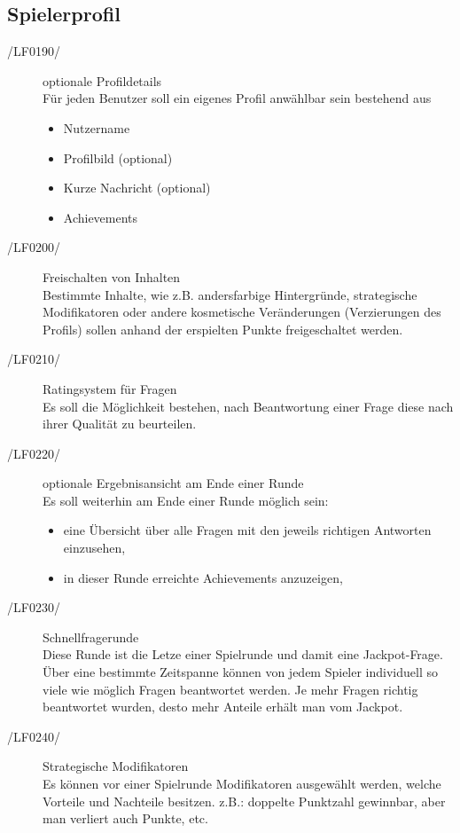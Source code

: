 \documentclass[11pt,a4paper]{scrreprt}
\begin{document}
\subsection{Spielerprofil}
\begin{description}
\item[/LF0190/] optionale Profildetails \\ 
Für jeden Benutzer soll ein eigenes Profil anwählbar sein bestehend aus
	\begin{itemize}
	\item Nutzername
	\item Profilbild (optional)
	\item Kurze Nachricht (optional)
	\item Achievements
	\end{itemize}
\item[/LF0200/] Freischalten von Inhalten \\
Bestimmte Inhalte, wie z.B. andersfarbige Hintergründe, strategische Modifikatoren oder andere kosmetische Veränderungen (Verzierungen des Profils) sollen anhand der erspielten Punkte freigeschaltet werden.
\item[/LF0210/] Ratingsystem für Fragen \\
Es soll die Möglichkeit bestehen, nach Beantwortung einer Frage diese nach ihrer Qualität zu beurteilen.
\item[/LF0220/] optionale Ergebnisansicht am Ende einer Runde \\
Es soll weiterhin am Ende einer Runde möglich sein:
		\begin{itemize}
		\item eine Übersicht über alle Fragen mit den jeweils richtigen Antworten einzusehen,
		\item in dieser Runde erreichte Achievements anzuzeigen,
		\end{itemize}
\item[/LF0230/] Schnellfragerunde \\
Diese Runde ist die Letze einer Spielrunde und damit eine Jackpot-Frage.
Über eine bestimmte Zeitspanne können von jedem Spieler individuell so viele wie möglich Fragen beantwortet werden.
Je mehr Fragen richtig beantwortet wurden, desto mehr Anteile erhält man vom Jackpot.
\item[/LF0240/] Strategische Modifikatoren \\
Es können vor einer Spielrunde Modifikatoren ausgewählt werden, welche Vorteile und Nachteile besitzen. z.B.: doppelte Punktzahl gewinnbar, aber man verliert auch Punkte, etc.
\end{description}
\end{document}
